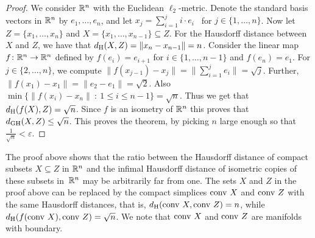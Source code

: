 \documentclass[11pt, reqno, english]{amsart}
\begin{document}
\vspace{3mm}
\mainFive*
\vspace{3mm}

\begin{proof}
We consider $\mathbb{R}^n$ with the Euclidean $\ell_2$-metric.
Denote the standard basis vectors in $\mathbb{R}^n$ by $e_1, \dots, e_n$, and let $x_j = \sum_{i=1}^j i\cdot e_i$ \ for $j\in\{1,\ldots ,n\}$.
Now let $Z = \{x_1, \dots, x_n\}$ and $X = \{x_1,\dots, x_{n-1}\} \subseteq Z$.
For the Hausdorff distance between $X$ and $Z$, we have that $d_{\mathrm{H}}(X,Z) = \|x_n - x_{n-1}\| = n$.
Consider the linear map $f \colon \mathbb{R}^n \to \mathbb{R}^n$ defined by $f(e_i) = e_{i+1}$ for $i \in \{1,\dots, n-1\}$ and $f(e_n) = e_1$.
For $j \in \{2,\dots,n\}$, we compute $\|f(x_{j-1}) - x_j\| = \|\sum_{i=1}^j e_i\| = \sqrt{j}$.
Further, $\|f(x_1) - x_1\| = \|e_2 - e_1\| = \sqrt{2}$.
Also $\min\{\|f(x_i) - x_n\|~:~1\le i\le n-1\} = \sqrt{n}$.
Thus we get that $d_{\mathrm{H}}(f(X),Z) = \sqrt{n}$.
Since $f$ is an isometry of $\mathbb{R}^n$ this proves that ${d_{\mathrm{GH}}(X,Z) \le \sqrt{n}}$.
This proves the theorem, by picking $n$ large enough so that $\frac{1}{\sqrt{n}}<\varepsilon$.
\end{proof}

\begin{remark}
\label{rem:boundary-and-not-dense}
The proof above shows that the ratio between the Hausdorff distance of compact subsets $X\subseteq Z$ in $\mathbb{R}^n$ and the infimal Hausdorff distance of isometric copies of these subsets in~$\mathbb{R}^n$ may be arbitrarily far from one.
The sets $X$ and $Z$ in the proof above can be replaced by the compact simplices $\mathrm{conv} \ X$ and $\mathrm{conv} \ Z$ with the same Hausdorff distances, that is, $d_\h(\conv \ X, \conv \ Z) = n$, while $d_{\mathrm{H}}(f(\mathrm{conv} \ X), \mathrm{conv} \ Z) = \sqrt{n}$.
We note that $\mathrm{conv} \ X$ and $\mathrm{conv} \ Z$ are manifolds with boundary.
\end{remark}


\end{document}
